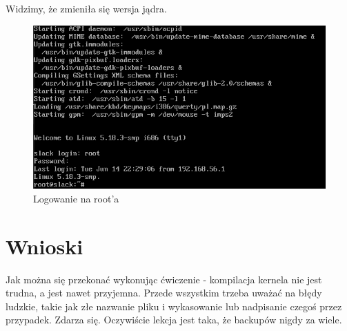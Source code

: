\documentclass[a4paper,12pt,oneside]{book} %
\begin{document}
Widzimy, że zmieniła się wersja jądra.

\begin{figure}[h]
	\centering
	\includegraphics[scale=0.5]{41-root}
	\caption{Logowanie na root'a}
\end{figure}

\chapter{Wnioski}
\label{Wnioski}

Jak można się przekonać wykonując ćwiczenie - kompilacja kernela nie jest trudna, a jest nawet przyjemna. Przede wszystkim trzeba uważać na błędy ludzkie, takie jak złe nazwanie pliku i wykasowanie lub nadpisanie czegoś przez przypadek. Zdarza się. Oczywiście lekcja jest taka, że backupów nigdy za wiele. 
\end{document}
